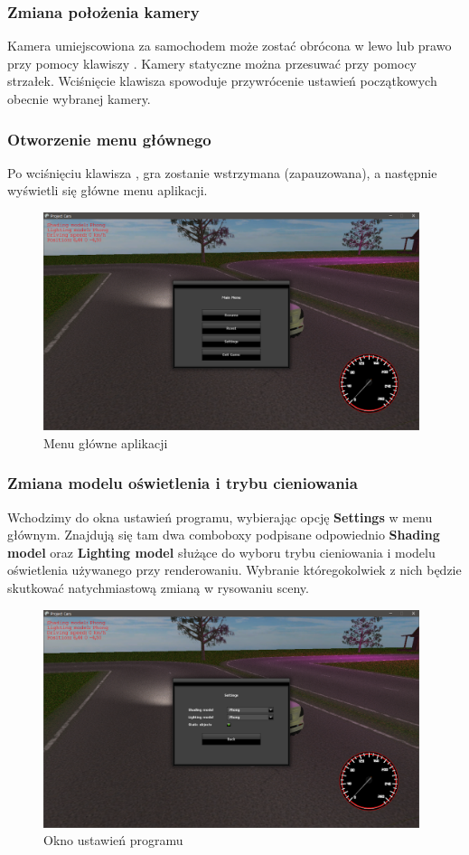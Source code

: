 \documentclass[10pt,a4paper]{article}
\begin{document}
\subsubsection{Zmiana położenia kamery}
Kamera umiejscowiona za samochodem może zostać obrócona w lewo lub prawo przy pomocy klawiszy . Kamery statyczne można przesuwać przy pomocy strzałek. Wciśnięcie klawisza  spowoduje przywrócenie ustawień początkowych obecnie wybranej kamery.

\newpage
\subsubsection{Otworzenie menu głównego}
Po wciśnięciu klawisza , gra zostanie wstrzymana (zapauzowana), a następnie wyświetli się główne menu aplikacji.
\begin{figure}[H]
  \centering
  \includegraphics[width=11cm]{Resources/Images/menu_main.png}
  \caption{Menu główne aplikacji}
\end{figure}

\subsubsection{Zmiana modelu oświetlenia i trybu cieniowania}
Wchodzimy do okna ustawień programu, wybierając opcję \textbf{Settings} w menu głównym. Znajdują się tam dwa comboboxy podpisane odpowiednio \textbf{Shading model} oraz \textbf{Lighting model} służące do wyboru trybu cieniowania i modelu oświetlenia używanego przy renderowaniu. Wybranie któregokolwiek z nich będzie skutkować natychmiastową zmianą w rysowaniu sceny.
\begin{figure}[H]
  \centering
  \includegraphics[width=11cm]{Resources/Images/menu_settings.png}
  \caption{Okno ustawień programu}
\end{figure}
\end{document}
